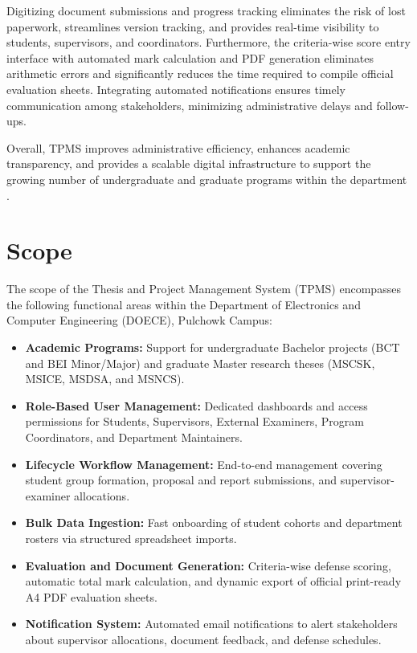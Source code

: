 Digitizing document submissions and progress tracking eliminates the risk of lost paperwork, streamlines version tracking, and provides real-time visibility to students, supervisors, and coordinators. Furthermore, the criteria-wise score entry interface with automated mark calculation and PDF generation eliminates arithmetic errors and significantly reduces the time required to compile official evaluation sheets. Integrating automated notifications ensures timely communication among stakeholders, minimizing administrative delays and follow-ups.

Overall, TPMS improves administrative efficiency, enhances academic transparency, and provides a scalable digital infrastructure to support the growing number of undergraduate and graduate programs within the department \cite{sommerville2016software}.

\section{Scope}
The scope of the Thesis and Project Management System (TPMS) encompasses the following functional areas within the Department of Electronics and Computer Engineering (DOECE), Pulchowk Campus:

\begin{itemize}
  \item \textbf{Academic Programs:} Support for undergraduate Bachelor projects (BCT and BEI Minor/Major) and graduate Master research theses (MSCSK, MSICE, MSDSA, and MSNCS).
  
  \item \textbf{Role-Based User Management:} Dedicated dashboards and access permissions for Students, Supervisors, External Examiners, Program Coordinators, and Department Maintainers.
  
  \item \textbf{Lifecycle Workflow Management:} End-to-end management covering student group formation, proposal and report submissions, and supervisor-examiner allocations.
  
  \item \textbf{Bulk Data Ingestion:} Fast onboarding of student cohorts and department rosters via structured spreadsheet imports.
  
  \item \textbf{Evaluation and Document Generation:} Criteria-wise defense scoring, automatic total mark calculation, and dynamic export of official print-ready A4 PDF evaluation sheets.
  
  \item \textbf{Notification System:} Automated email notifications to alert stakeholders about supervisor allocations, document feedback, and defense schedules.
\end{itemize}

